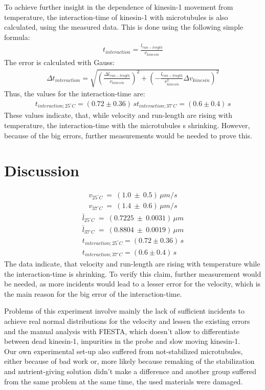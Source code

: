 \documentclass[english, %
parskip=full, %
bibliography=totoc, %
]{scrartcl}
\begin{document}
To achieve further insight in the dependence of kinesin-1 movement from temperature, the interaction-time of kinesin-1 with microtubules is also calculated, using the measured data. This is done using the following simple formula:
\begin{align*}
t_{interaction} = \frac{l_{run-length}}{v_{kinesin}}
\end{align*}
The error is calculated with Gauss:
\begin{align*}
\Delta t_{interaction} = \sqrt{(\frac{\Delta l_{run-length}}{v_{kinesin}})^2 + (- \frac{l_{run-length}}{v_{kinesin}^2} \Delta v_{kinesin})^2}
\end{align*}
Thus, the values for the interaction-time are:
\begin{align*}
t_{interaction; 25^\circ C} = (0.72 \pm 0.36)\,s
t_{interaction; 37^\circ C} = (0.6 \pm 0.4)\,s
\end{align*}
These values indicate, that, while velocity and run-length are rising with temperature, the interaction-time with the microtubules s shrinking. However, because of the big errors, further measurements would be needed to prove this.

\section{Discussion}

\begin{align*}
v_{25^\circ C} \ = \ (1.0 \ \pm \ 0.5) \, \mu m/s \\
v_{37^\circ C} \ = \ (1.4 \ \pm \ 0.6) \, \mu m/s
\end{align*}
\begin{align*}
\bar{l} _{25^\circ C} \ = \ (0.7225 \ \pm \ 0.0031) \, \mu m \\
\bar{l} _{37^\circ C} \ = \ (0.8804 \ \pm \ 0.0019) \, \mu m
\end{align*}
\begin{align*}
t_{interaction; 25^\circ C} = (0.72 \pm 0.36)\,s \\
t_{interaction; 37^\circ C} = (0.6 \pm 0.4)\,s
\end{align*}
The data indicate, that velocity and run-length are rising with temperature while the interaction-time is shrinking. To verify this claim, further measurement would be needed, as more incidents would lead to a lesser error for the velocity, which is the main reason for the big error of the interaction-time.

Problems of this experiment involve mainly the lack of sufficient incidents to achieve real normal distributions for the velocity and lessen the existing errors and the manual analysis with FIESTA, which doesn't allow to differentiate between dead kinesin-1, impurities in the probe and slow moving kinesin-1. \\
Our own experimental set-up also suffered from not-stabilized microtubules, either because of bad work or, more likely because remaking of the stabilization and nutrient-giving solution didn't make a difference and another group suffered from the same problem at the same time, the used materials were damaged.
\end{document}
